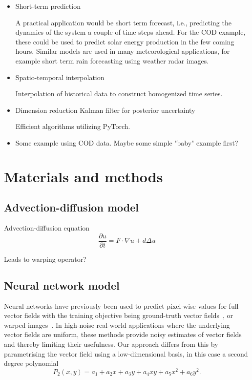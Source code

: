 \documentclass[a4paper,12pt]{article}
\begin{document}
\begin{itemize}
    \item
        Short-term prediction

        A practical application would be short term forecast, i.e., predicting the dynamics of the system a couple of time steps ahead. For the COD example, these could be used to predict solar energy production in the few coming hours. Similar models are used in many meteorological applications, for example short term rain forecasting using weather radar images.

    \item
        Spatio-temporal interpolation

        Interpolation of historical data to construct homogenized time series.

        
    \item
        Dimension reduction Kalman filter for posterior uncertainty

        Efficient algorithms utilizing PyTorch.

    \item Some example using COD data. Maybe some simple "baby" example first?

\end{itemize}







\section{Materials and methods}
\subsection{Advection-diffusion model}
Advection-diffusion equation
\begin{equation}
    \frac{\partial u}{\partial t} = F \cdot \nabla u + d \Delta u
\end{equation}

Leads to warping operator?


\subsection{Neural network model}
Neural networks have previously been used to predict pixel-wise values for full vector fields with the training objective being ground-truth vector fields~\cite{ofnn}, or warped images~\cite{debezenac}.
In high-noise real-world applications where the underlying vector fields are uniform, these methods provide noisy estimates of vector fields and thereby limiting their usefulness.
Our approach differs from this by parametrising the vector field using a low-dimensional basis, in this case a second degree polynomial
\begin{equation}
    P_2(x,y) = a_1 + a_2x + a_3y + a_4xy + a_5x^2+a_6y^2.
\end{equation}
\end{document}
